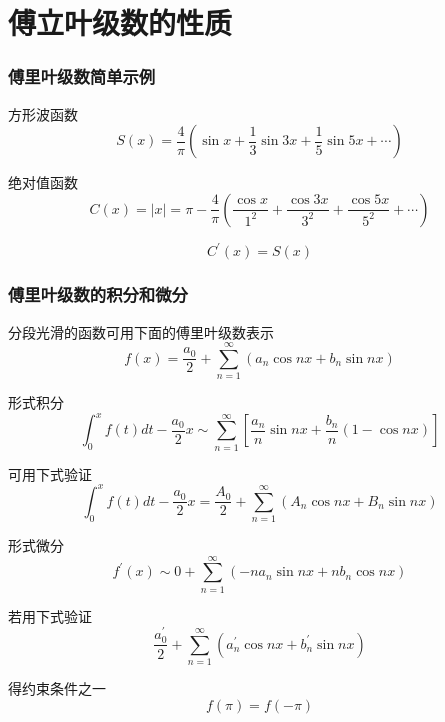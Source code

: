 \documentclass[10pt]{beamer}
\begin{document}
\section{傅立叶级数的性质}


\begin{frame}[allowframebreaks]
  \frametitle{傅里叶级数简单示例}
  
  方形波函数
  \begin{equation}
  S(x)=\frac{4}{\pi}\left(\sin x+\frac{1}{3} \sin 3 x+\frac{1}{5} \sin 5 x+\cdots\right)
  \end{equation}
  
  绝对值函数
  \begin{equation}
  C(x)=|x|=\pi-\frac{4}{\pi}\left(\frac{\cos x}{1^{2}}+\frac{\cos 3 x}{3^{2}}+\frac{\cos 5 x}{5^{2}}+\cdots\right)
  \end{equation}
  
  \begin{equation}
  C^{\prime}(x)=S(x)
  \end{equation}
  \end{frame}
  
  \begin{frame}[allowframebreaks]
  \frametitle{傅里叶级数的积分和微分}
  
  分段光滑的函数可用下面的傅里叶级数表示
  \begin{equation}
  f(x)=\frac{a_{0}}{2}+\sum_{n=1}^{\infty}\left(a_{n} \cos n x+b_{n} \sin n x\right)
  \end{equation}
  
  形式积分
  \begin{equation}
  \int_{0}^{x} f(t) d t-\frac{a_{0}}{2} x \sim \sum_{n=1}^{\infty}\left[\frac{a_{n}}{n} \sin n x+\frac{b_{n}}{n}(1-\cos n x)\right]
  \end{equation}
  
  可用下式验证
  \begin{equation}
  \int_{0}^{x} f(t) d t-\frac{a_{0}}{2} x=\frac{A_{0}}{2}+\sum_{n=1}^{\infty}\left(A_{n} \cos n x+B_{n} \sin n x\right)
  \end{equation}
  
  形式微分
  \begin{equation}
  f^{\prime}(x) \sim 0+\sum_{n=1}^{\infty}\left(-n a_{n} \sin n x+n b_{n} \cos n x\right)
  \end{equation}
  
  若用下式验证
  \begin{equation}
  \frac{a_{0}^{\prime}}{2}+\sum_{n=1}^{\infty}\left(a_{n}^{\prime} \cos n x+b_{n}^{\prime} \sin n x\right)
  \end{equation}
  
  得约束条件之一
  \begin{equation}
  f(\pi)=f(-\pi)
  \end{equation}
  \end{frame}
  
\end{document}
